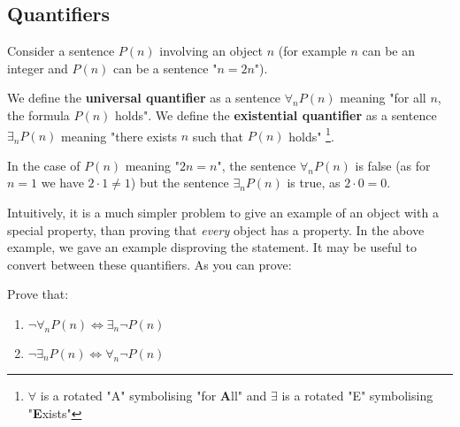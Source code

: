 \subsection{Quantifiers}
Consider a sentence $P(n)$ involving an object $n$ (for example $n$ can be an integer and $P(n)$ can be a sentence "$n=2n$").
\begin{definition}
  We define the \textbf{universal quantifier}
  as a sentence $\forall_n P(n)$ meaning "for all $n$, the formula $P(n)$ holds".
  We define the \textbf{existential quantifier} as a sentence $\exists_n P(n)$ meaning "there exists $n$ such that $P(n)$ holds"
  \footnote{$\forall$ is a rotated "A" symbolising "for \textbf{A}ll" and $\exists$ is a rotated "E" symbolising "\textbf{E}xists"}.
\end{definition}

\begin{example}
  In the case of $P(n)$ meaning "$2n=n$", the sentence $\forall_n P(n)$ is false (as for $n=1$ we have $2\cdot 1\neq 1$) but the sentence $\exists_n P(n)$ is true,
  as $2\cdot 0=0$.
\end{example}

Intuitively, it is a much simpler problem to give an example of an object with a special property, than proving that \emph{every} object has a property.
In the above example, we gave an example disproving the statement. It may be useful to convert between these quantifiers. As you can prove:

\begin{exercise}
  Prove that:
  \begin{enumerate}
    \item $\neg \forall_n P(n) \Leftrightarrow \exists_n \neg P(n)$
    \item $\neg \exists_n P(n) \Leftrightarrow \forall_n \neg P(n)$
  \end{enumerate}
\end{exercise}
